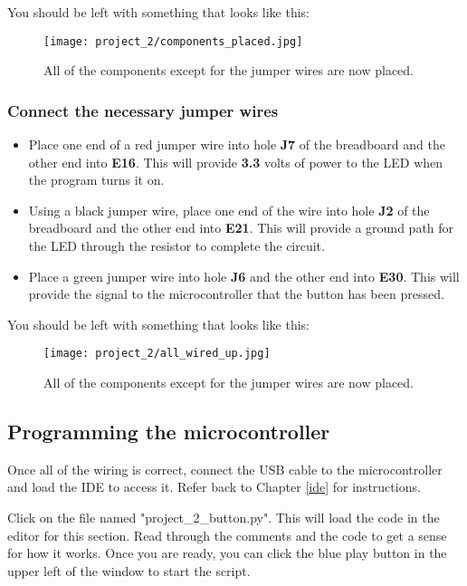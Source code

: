 You should be left with something that looks like this:
\begin{figure}[H]
    \centering
    \texttt{[image: project\_2/components\_placed.jpg]}
    \caption{All of the components except for the jumper wires are now placed.}
\end{figure}

\subsubsection{Connect the necessary jumper wires}
\begin{itemize}
    \item Place one end of a red jumper wire into hole \textbf{J7} of the breadboard and the other end into
    \textbf{E16}. This will provide \textbf{3.3} volts of power to the LED when the program turns it on.
    \item Using a black jumper wire, place one end of the wire into hole \textbf{J2} of the breadboard and the other
    end into \textbf{E21}. This will provide a ground path for the LED through the resistor to complete the circuit.
    \item Place a green jumper wire into hole \textbf{J6} and the other end into \textbf{E30}. This
    will provide the signal to the microcontroller that the button has been pressed.
\end{itemize}

You should be left with something that looks like this:
\begin{figure}[H]
    \centering
    \texttt{[image: project\_2/all\_wired\_up.jpg]}
    \caption{All of the components except for the jumper wires are now placed.}
\end{figure}

\subsection{Programming the microcontroller}

Once all of the wiring is correct, connect the USB cable to the microcontroller and load the IDE to
access it. Refer back to Chapter \ref{ide} for instructions.

Click on the file named "project\_2\_button.py". This will load the code in the editor for this section.
Read through the comments and the code to get a sense for how it works. Once you are ready, you can
click the blue play button in the upper left of the window to start the script.

